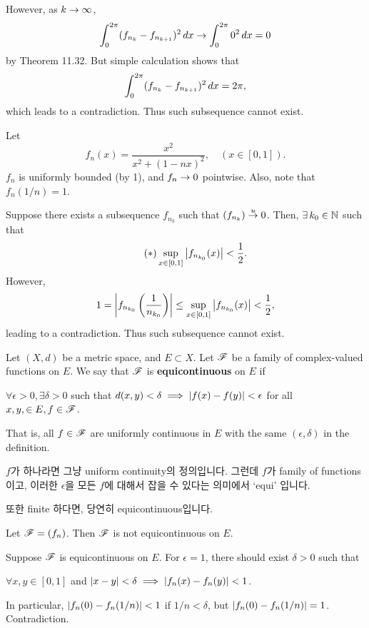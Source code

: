 However, as \(k \rightarrow \infty\),
\[
    \int_0^{2\pi} (f_{n_k} - f_{n_{k+1}})^2 \,d{x} \rightarrow \int_0^{2\pi} 0^2 \,d{x} = 0
\]
by Theorem 11.32. But simple calculation shows that
\[
    \int_0^{2\pi} (f_{n_k} - f_{n_{k+1}})^2 \,d{x} = 2\pi,
\]
which leads to a contradiction. Thus such subsequence cannot exist.


 Let
\[
    f_n(x) = \frac{x^2}{x^2 + (1-nx)^2}, \quad (x\in [0, 1]).
\]
\(f_n\) is uniformly bounded (by 1), and \(f_n \rightarrow 0\) pointwise. Also, note that \(f_n(1/n) = 1\).

Suppose there exists a subsequence \(f_{n_k}\) such that \(\left( f_{n_k} \right) \overset{u}{\rightarrow} 0\). Then, \(\exists k_0 \in \N\) such that
\[ \tag{\(\ast\)}
    \sup_{x \in [0, 1]} \left| f_{n_{k_0}}(x) \right| < \frac{1}{2}.
\]
However,
\[
    1 = \left| f_{n_{k_0}}\left(\frac{1}{n_{k_0}}\right) \right| \leq \sup_{x \in [0, 1]} \left| f_{n_{k_0}}(x) \right| < \frac{1}{2},
\]
leading to a contradiction. Thus such subsequence cannot exist.

 Let \((X, d)\) be a metric space, and \(E \subset X\). Let \(\mathscr{F}\) be a family of complex-valued functions on \(E\). We say that \(\mathscr{F}\) is \textbf{equicontinuous} on \(E\) if
\begin{center}
    \(\forall \epsilon > 0, \exists \delta > 0\) such that \(d(x, y) < \delta \implies \left| f(x) - f(y) \right| < \epsilon\) for all \(x, y, \in E, f\in \mathscr{F}\).
\end{center}
That is, all \(f \in \mathscr{F}\) are uniformly continuous in \(E\) with the same \((\epsilon, \delta)\) in the definition.

\(f\)가 하나라면 그냥 uniform continuity의 정의입니다. 그런데 \(f\)가 family of functions이고, 이러한 \(\epsilon\)을 모든 \(f\)에 대해서 잡을 수 있다는 의미에서 `equi' 입니다.

또한 finite 하다면, 당연히 equicontinuous입니다.

\rmk {} Let \(\mathscr{F} = \left( f_n \right)\). Then \(\mathscr{F}\) is not equicontinuous on \(E\).

\pf Suppose \(\mathscr{F}\) is equicontinuous on \(E\). For \(\epsilon = 1\), there should exist \(\delta > 0\) such that
\begin{center}
    \(\forall x, y \in [0, 1]\) and \(\left| x - y \right| < \delta \implies \left| f_n(x) - f_n(y) \right| < 1\).
\end{center}
In particular, \(\left| f_n(0) - f_n(1/n) \right| < 1\) if \(1 / n < \delta\), but \(\left| f_n(0) - f_n(1/n) \right| = 1\). Contradiction.

\medskip

